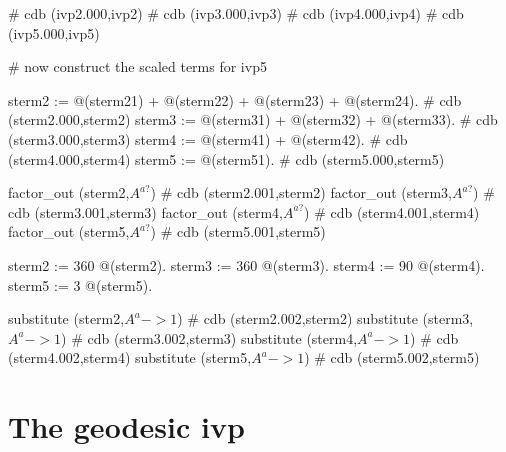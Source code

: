 \documentclass[12pt]{cdblatex}
\begin{document}
\begin{cadabra}
   # cdb (ivp2.000,ivp2)
   # cdb (ivp3.000,ivp3)
   # cdb (ivp4.000,ivp4)
   # cdb (ivp5.000,ivp5)

   # now construct the scaled terms for ivp5

   sterm2 := @(sterm21) + @(sterm22) + @(sterm23) + @(sterm24).  # cdb (sterm2.000,sterm2)
   sterm3 := @(sterm31) + @(sterm32) + @(sterm33).               # cdb (sterm3.000,sterm3)
   sterm4 := @(sterm41) + @(sterm42).                            # cdb (sterm4.000,sterm4)
   sterm5 := @(sterm51).                                         # cdb (sterm5.000,sterm5)

   factor_out (sterm2,$A^{a?}$)                                  # cdb (sterm2.001,sterm2)
   factor_out (sterm3,$A^{a?}$)                                  # cdb (sterm3.001,sterm3)
   factor_out (sterm4,$A^{a?}$)                                  # cdb (sterm4.001,sterm4)
   factor_out (sterm5,$A^{a?}$)                                  # cdb (sterm5.001,sterm5)

   sterm2 := 360 @(sterm2).
   sterm3 := 360 @(sterm3).
   sterm4 :=  90 @(sterm4).
   sterm5 :=   3 @(sterm5).

   substitute (sterm2,$A^{a}->1$)                                # cdb (sterm2.002,sterm2)
   substitute (sterm3,$A^{a}->1$)                                # cdb (sterm3.002,sterm3)
   substitute (sterm4,$A^{a}->1$)                                # cdb (sterm4.002,sterm4)
   substitute (sterm5,$A^{a}->1$)                                # cdb (sterm5.002,sterm5)

\end{cadabra}


\clearpage

\section*{The geodesic ivp}
\end{document}
